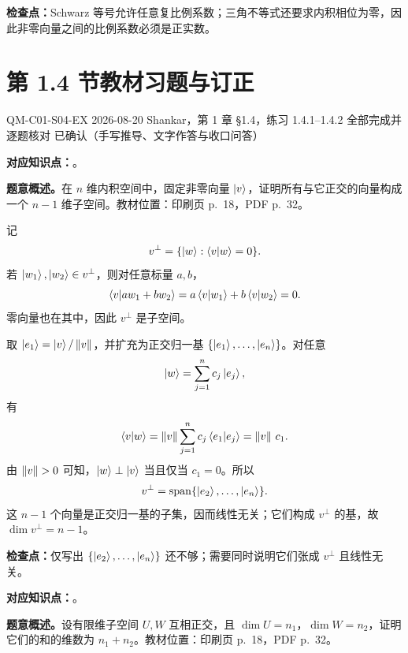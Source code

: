 \textbf{检查点：}Schwarz 等号允许任意复比例系数；三角不等式还要求内积相位为零，因此非零向量之间的比例系数必须是正实数。

\section{第 1.4 节教材习题与订正}
\label{exercise-set:QM-C01-S04}

\exercisemeta
  {QM-C01-S04-EX}
  {2026-08-20}
  {Shankar，第 1 章 \S 1.4，练习 1.4.1--1.4.2}
  {全部完成并逐题核对}
  {已确认（手写推导、文字作答与收口问答）}


\textbf{对应知识点：}。

\textbf{题意概述。}在 $n$ 维内积空间中，固定非零向量 $\left|v\right\rangle$，证明所有与它正交的向量构成一个 $n-1$ 维子空间。教材位置：印刷页 p.~18，PDF p.~32。

\begin{checkedsolution}
记
\[
  v^\perp=\{\left|w\right\rangle:\left\langle v \middle| w \right\rangle=0\}.
\]
若 $\left|w_1\right\rangle,\left|w_2\right\rangle\in v^\perp$，则对任意标量 $a,b$，
\[
  \left\langle v \middle| a w_1+b w_2 \right\rangle
  =a\left\langle v \middle| w_1 \right\rangle+b\left\langle v \middle| w_2 \right\rangle=0.
\]
零向量也在其中，因此 $v^\perp$ 是子空间。

取 $\left|e_1\right\rangle=\left|v\right\rangle/\left\lVert v \right\rVert$，并扩充为正交归一基 $\{\left|e_1\right\rangle,\ldots,\left|e_n\right\rangle\}$。对任意
\[
  \left|w\right\rangle=\sum_{j=1}^{n}c_j\left|e_j\right\rangle,
\]
有
\[
  \left\langle v \middle| w \right\rangle
  =\left\lVert v \right\rVert\sum_{j=1}^{n}c_j\left\langle e_1 \middle| e_j \right\rangle
  =\left\lVert v \right\rVert\,c_1.
\]
由 $\left\lVert v \right\rVert>0$ 可知，$\left|w\right\rangle\perp\left|v\right\rangle$ 当且仅当 $c_1=0$。所以
\[
  v^\perp=\operatorname{span}\{\left|e_2\right\rangle,\ldots,\left|e_n\right\rangle\}.
\]
这 $n-1$ 个向量是正交归一基的子集，因而线性无关；它们构成 $v^\perp$ 的基，故 $\dim v^\perp=n-1$。
\end{checkedsolution}

\textbf{检查点：}仅写出 $\{\left|e_2\right\rangle,\ldots,\left|e_n\right\rangle\}$ 还不够；需要同时说明它们张成 $v^\perp$ 且线性无关。


\textbf{对应知识点：}。

\textbf{题意概述。}设有限维子空间 $U,W$ 互相正交，且 $\dim U=n_1$，$\dim W=n_2$，证明它们的和的维数为 $n_1+n_2$。教材位置：印刷页 p.~18，PDF p.~32。

